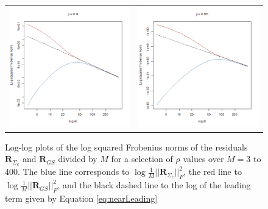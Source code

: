 \documentclass[letterpaper,12pt,oneside,final]{article}
\newcommand{\m}[1]{\mathbf{#1}}               %
\newcommand{\norm}[1]{||{#1}||}              %
\newcommand{\frob}[1]{\norm{#1}_F}
\begin{document}
\begin{figure}
\begin{tabular}{cc}
    \includegraphics[scale = 0.45]{rho90.png} & \includegraphics[scale = 0.45]{rho95.png}
  \end{tabular}
  \caption{Log-log plots of the log squared Frobenius norms of the residuals $\m{R}_{\Sigma_e}$ and $\m{R}_{GS}$ divided by $M$ for a selection of $\rho$ values over $M = 3$ to 400. The blue line corresponds to $\log \frac{1}{M} \frob{\m{R}_{\Sigma_e}}^2$, the red line to  $\log \frac{1}{M} \frob{\m{R}_{GS}}^2$, and the black dashed line to the log of the leading term given by Equation \ref{eq:nearLeading}} \label{fig:rhoPlots}
\end{figure}
\end{document}
